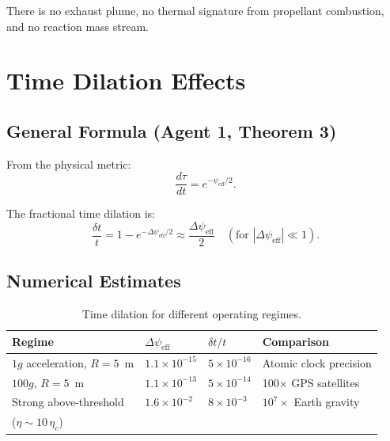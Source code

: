 \documentclass[12pt,aps,prd,superscriptaddress,nofootinbib,longbibliography]{revtex4-2}
\newcommand{\etac}{\eta_c}
\begin{document}
There is no exhaust plume, no thermal signature from propellant
combustion, and no reaction mass stream.


\section{Time Dilation Effects}\label{sec:time-dilation}

\subsection{General Formula (Agent 1, Theorem 3)}

From the physical metric:
\begin{equation}
\frac{d\tau}{dt} = e^{-\psi_{\mathrm{eff}}/2}.
\end{equation}

The fractional time dilation is:
\begin{equation}
\frac{\delta t}{t} = 1 - e^{-\Delta\psi_{\mathrm{eff}}/2}
\approx \frac{\Delta\psi_{\mathrm{eff}}}{2}
\quad (\text{for } |\Delta\psi_{\mathrm{eff}}| \ll 1).
\end{equation}

\subsection{Numerical Estimates}

\begin{table}[h]
\caption{Time dilation for different operating regimes.}
\begin{ruledtabular}
\begin{tabular}{llll}
Regime & $\Delta\psi_{\mathrm{eff}}$ & $\delta t/t$ & Comparison \\
\hline
$1g$ acceleration, $R = 5$~m & $1.1 \times 10^{-15}$ & $5 \times 10^{-16}$
  & Atomic clock precision \\
$100g$, $R = 5$~m & $1.1 \times 10^{-13}$ & $5 \times 10^{-14}$
  & 100$\times$ GPS satellites \\
Strong above-threshold & $1.6 \times 10^{-2}$ & $8 \times 10^{-3}$
  & $10^7 \times$ Earth gravity \\
  ($\eta \sim 10\,\etac$) & & & \\
\end{tabular}
\end{ruledtabular}
\end{table}
\end{document}
